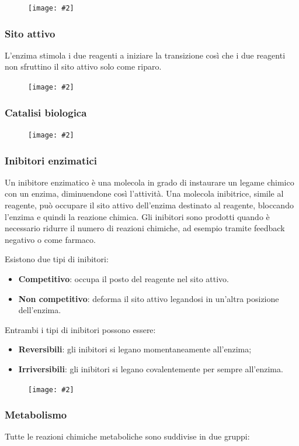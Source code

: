 \documentclass{article}
\newcommand{\cfig}[2]{
    \phantom{}
    \begin{figure}[ht!]
        \begin{center}
            \texttt{[image: \#2]}
        \end{center}
    \end{figure}
}
\begin{document}
\cfig{.75}{media/cat.png}

\subsubsection{Sito attivo}
L'enzima stimola i due reagenti a iniziare la transizione così che i due reagenti non sfruttino
il sito attivo solo come riparo.

\cfig{.75}{media/sito-attivo.png}

\subsubsection{Catalisi biologica}

\cfig{.75}{media/energy-reaction.png}

\subsubsection{Inibitori enzimatici}
Un inibitore enzimatico è una molecola in grado di instaurare un legame chimico con un enzima,
diminuendone così l'attività. Una molecola inibitrice, simile al reagente, può occupare il
sito attivo dell'enzima destinato al reagente, bloccando l'enzima e quindi la reazione chimica.
Gli inibitori sono prodotti quando è necessario ridurre il numero di reazioni chimiche,
ad esempio tramite feedback negativo o come farmaco.

Esistono due tipi di inibitori:
\begin{itemize}
    \item \textbf{Competitivo}: occupa il posto del reagente nel sito attivo.
    \item \textbf{Non competitivo}: deforma il sito attivo legandosi in un'altra posizione dell'enzima.
\end{itemize}

Entrambi i tipi di inibitori possono essere:
\begin{itemize}
    \item \textbf{Reversibili}: gli inibitori si legano momentaneamente all'enzima;
    \item \textbf{Irriversibili}: gli inibitori si legano covalentemente per sempre all'enzima.
\end{itemize}

\cfig{.8}{media/inibitori.png}

\subsubsection{Metabolismo}
Tutte le reazioni chimiche metaboliche sono suddivise in due gruppi:
\end{document}
